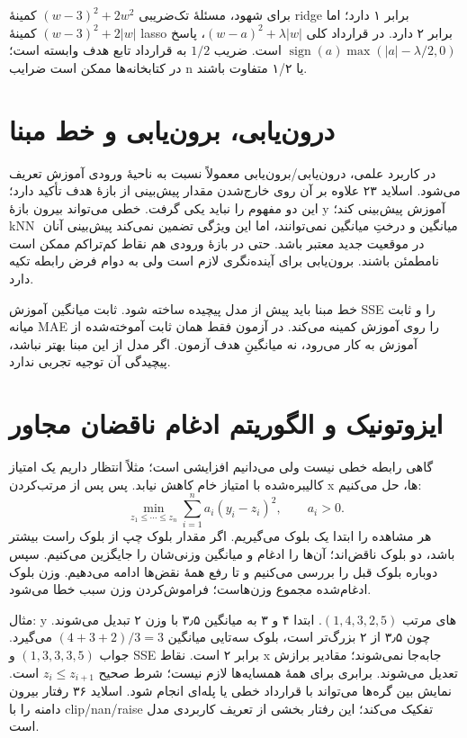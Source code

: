 \documentclass[12pt,a4paper,oneside]{report}
\begin{document}
برای شهود، مسئلهٔ تک‌ضریبی \((w-3)^2+2w^2\) کمینهٔ ridge برابر ۱ دارد؛ اما \((w-3)^2+2|w|\) کمینهٔ lasso برابر ۲ دارد. در قرارداد کلی \((w-a)^2+\lambda|w|\)، پاسخ \(\operatorname{sign}(a)\max(|a|-\lambda/2,0)\) است. ضریب \(1/2\) به قرارداد تابع هدف وابسته است؛ در کتابخانه‌ها ممکن است ضرایب n یا ۱/۲ متفاوت باشند.

\section{درون‌یابی، برون‌یابی و خط مبنا}

در کاربرد علمی، درون‌یابی/برون‌یابی معمولاً نسبت به ناحیهٔ ورودی آموزش تعریف می‌شود. اسلاید ۲۳ علاوه بر آن روی خارج‌شدن مقدار پیش‌بینی از بازهٔ هدف تأکید دارد؛ این دو مفهوم را نباید یکی گرفت. خطی می‌تواند بیرون بازهٔ y آموزش پیش‌بینی کند؛ kNN ِ میانگین و درختِ میانگین نمی‌توانند، اما این ویژگی تضمین نمی‌کند پیش‌بینی آنان در موقعیت جدید معتبر باشد. حتی در بازهٔ ورودی هم نقاط کم‌تراکم ممکن است نامطمئن باشند. برون‌یابی برای آینده‌نگری لازم است ولی به دوام فرض رابطه تکیه دارد.

خط مبنا باید پیش از مدل پیچیده ساخته شود. ثابت میانگین آموزش SSE را و ثابت میانه MAE را روی آموزش کمینه می‌کند. در آزمون فقط همان ثابت آموخته‌شده از آموزش به کار می‌رود، نه میانگینِ هدف آزمون. اگر مدل از این مبنا بهتر نباشد، پیچیدگی آن توجیه تجربی ندارد.

\section{ایزوتونیک و الگوریتم ادغام ناقضان مجاور}

گاهی رابطه خطی نیست ولی می‌دانیم افزایشی است؛ مثلاً انتظار داریم یک امتیاز کالیبره‌شده با امتیاز خام کاهش نیابد. پس پس از مرتب‌کردن x ها، حل می‌کنیم: \[
\min_{z_1\le\cdots\le z_n}\sum_{i=1}^n a_i(y_i-z_i)^2,\qquad a_i>0.
\] هر مشاهده را ابتدا یک بلوک می‌گیریم. اگر مقدار بلوک چپ از بلوک راست بیشتر باشد، دو بلوک ناقض‌اند؛ آن‌ها را ادغام و میانگین وزنی‌شان را جایگزین می‌کنیم. سپس دوباره بلوک قبل را بررسی می‌کنیم و تا رفع همهٔ نقض‌ها ادامه می‌دهیم. وزن بلوک ادغام‌شده مجموع وزن‌هاست؛ فراموش‌کردن وزن سبب خطا می‌شود.

مثال: y های مرتب \((1,4,3,2,5)\). ابتدا ۴ و ۳ به میانگین ۳٫۵ با وزن ۲ تبدیل می‌شوند. چون ۳٫۵ از ۲ بزرگ‌تر است، بلوک سه‌تایی میانگین \((4+3+2)/3=3\) می‌گیرد. جواب \((1,3,3,3,5)\) و SSE برابر ۲ است. نقاط x جابه‌جا نمی‌شوند؛ مقادیر برازش تعدیل می‌شوند. برابری برای همهٔ همسایه‌ها لازم نیست؛ شرط صحیح \(z_i\le z_{i+1}\) است. نمایش بین گره‌ها می‌تواند با قرارداد خطی یا پله‌ای انجام شود. اسلاید ۳۶ رفتار بیرون دامنه را با clip/nan/raise تفکیک می‌کند؛ این رفتار بخشی از تعریف کاربردی مدل است.
\end{document}

